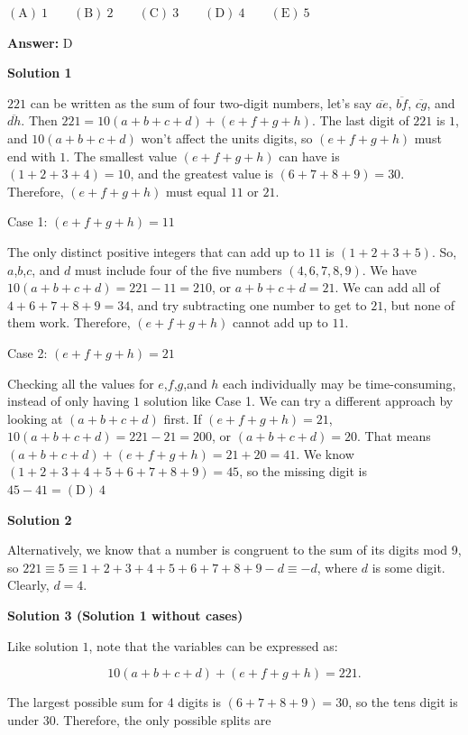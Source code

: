 \begin{enumerate}
 $\mathrm{(A)}\ 1      \qquad \mathrm{(B)}\ 2      \qquad \mathrm{(C)}\ 3      \qquad \mathrm{(D)}\ 4      \qquad \mathrm{(E)}\ 5$

 \textbf{Answer: }D



\textbf{Solution 1}

$221$ can be written as the sum of four two-digit numbers, let's say $\overline{ae}$, $\overline{bf}$, $\overline{cg}$, and $\overline{dh}$. Then $221= 10(a+b+c+d)+(e+f+g+h)$. The last digit of $221$ is $1$, and $10(a+b+c+d)$ won't affect the units digits, so $(e+f+g+h)$ must end with $1$. The smallest value $(e+f+g+h)$ can have is $(1+2+3+4)=10$, and the greatest value is $(6+7+8+9)=30$. Therefore, $(e+f+g+h)$ must equal $11$ or $21$. 

 Case 1: $(e+f+g+h)=11$

 The only distinct positive integers that can add up to $11$ is $(1+2+3+5)$. So, $a$,$b$,$c$, and $d$ must include four of the five numbers $(4,6,7,8,9)$. We have $10(a+b+c+d)=221-11=210$, or $a+b+c+d=21$. We can add all of $4+6+7+8+9=34$, and try subtracting one number to get to $21$, but none of them work. Therefore, $(e+f+g+h)$ cannot add up to $11$.

 Case 2: $(e+f+g+h)=21$

 Checking all the values for $e$,$f$,$g$,and $h$ each individually may be time-consuming, instead of only having $1$ solution like Case 1. We can try a different approach by looking at $(a+b+c+d)$ first. If $(e+f+g+h)=21$, $10(a+b+c+d)=221-21=200$, or $(a+b+c+d)=20$. That means $(a+b+c+d)+(e+f+g+h)=21+20=41$. We know $(1+2+3+4+5+6+7+8+9)=45$, so the missing digit is $45-41=\boxed{\mathrm{(D)}\ 4}$




\textbf{Solution 2}

Alternatively, we know that a number is congruent to the sum of its digits mod 9, so $221 \equiv 5 \equiv 1 + 2 + 3 + 4 + 5 + 6 + 7 + 8 + 9 - d \equiv -d$, where $d$ is some digit. Clearly, $\boxed{d = 4}$.

 



\textbf{Solution 3 (Solution 1 without cases)}

Like solution $1$, note that the variables can be expressed as:

 
 \[10(a + b + c + d) + (e + f + g + h) = 221.\]

 The largest possible sum for 4 digits is $(6 + 7 + 8 + 9) = 30$, so the tens digit is under $30$. Therefore, the only possible splits are


\end{enumerate}
